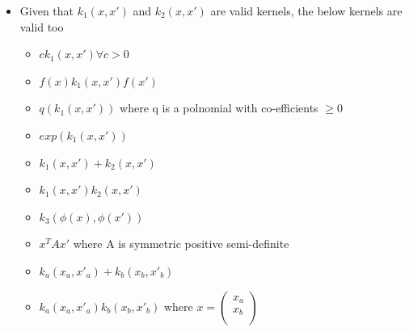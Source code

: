 \documentclass[parskip=half]{scrartcl}
\begin{document}
\begin{itemize}
        \item
        Given that $k_1(x, x')$ and $k_2(x, x')$ are valid kernels, the below kernels are valid too
        \begin{itemize}
            \item 
            $ck_1(x, x') \forall c>0 $
            \item 
            $f(x)k_1(x, x')f(x') $
            \item 
            $q(k_1(x, x')) $ where q is a polnomial with co-efficients $\geq 0$
            \item 
            $exp(k_1(x, x')) $
            \item 
            $k_1(x, x') + k_2(x, x')$
            \item 
            $k_1(x, x')k_2(x, x')$
            \item 
            $k_3(\phi(x), \phi(x'))$
            \item 
            $x^T A x'$ where A is symmetric positive semi-definite
            \item 
            $k_a(x_a, x'_a) + k_b(x_b, x'_b)$
            \item 
            $k_a(x_a, x'_a)k_b(x_b, x'_b)$ where $x = \left(\begin{array}{c} x_a\\ x_b\\ \end{array} \right)$
        \end{itemize}

    \end{itemize}

\end{document}
